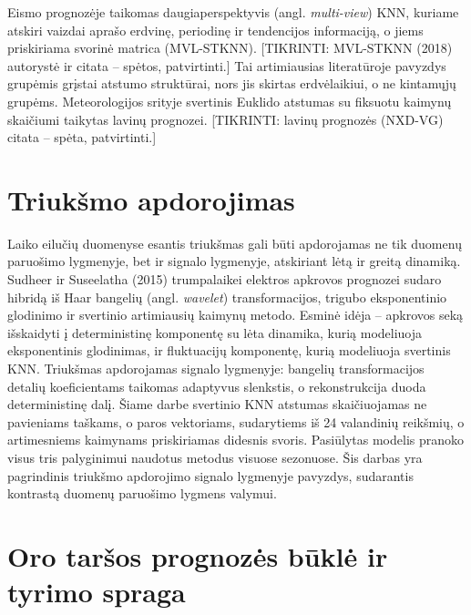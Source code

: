 \documentclass[]{VUMIFTemplateClass}
\begin{document}
    Eismo prognozėje taikomas daugiaperspektyvis (angl. \textit{multi-view}) KNN, kuriame atskiri vaizdai aprašo erdvinę, periodinę ir tendencijos informaciją, o jiems priskiriama svorinė matrica (MVL-STKNN). [TIKRINTI: MVL-STKNN (2018) autorystė ir citata -- spėtos, patvirtinti.] Tai artimiausias literatūroje pavyzdys grupėmis grįstai atstumo struktūrai, nors jis skirtas erdvėlaikiui, o ne kintamųjų grupėms. Meteorologijos srityje svertinis Euklido atstumas su fiksuotu kaimynų skaičiumi taikytas lavinų prognozei. [TIKRINTI: lavinų prognozės (NXD-VG) citata -- spėta, patvirtinti.]


    \section{Triukšmo apdorojimas}

    Laiko eilučių duomenyse esantis triukšmas gali būti apdorojamas ne tik duomenų paruošimo lygmenyje, bet ir signalo lygmenyje, atskiriant lėtą ir greitą dinamiką. Sudheer ir Suseelatha (2015) trumpalaikei elektros apkrovos prognozei sudaro hibridą iš Haar bangelių (angl. \textit{wavelet}) transformacijos, trigubo eksponentinio glodinimo ir svertinio artimiausių kaimynų metodo. Esminė idėja -- apkrovos seką išskaidyti į deterministinę komponentę su lėta dinamika, kurią modeliuoja eksponentinis glodinimas, ir fluktuacijų komponentę, kurią modeliuoja svertinis KNN. Triukšmas apdorojamas signalo lygmenyje: bangelių transformacijos detalių koeficientams taikomas adaptyvus slenkstis, o rekonstrukcija duoda deterministinę dalį. Šiame darbe svertinio KNN atstumas skaičiuojamas ne pavieniams taškams, o paros vektoriams, sudarytiems iš 24 valandinių reikšmių, o artimesniems kaimynams priskiriamas didesnis svoris. Pasiūlytas modelis pranoko visus tris palyginimui naudotus metodus visuose sezonuose. Šis darbas yra pagrindinis triukšmo apdorojimo signalo lygmenyje pavyzdys, sudarantis kontrastą duomenų paruošimo lygmens valymui.


    \section{Oro taršos prognozės būklė ir tyrimo spraga}
\end{document}
